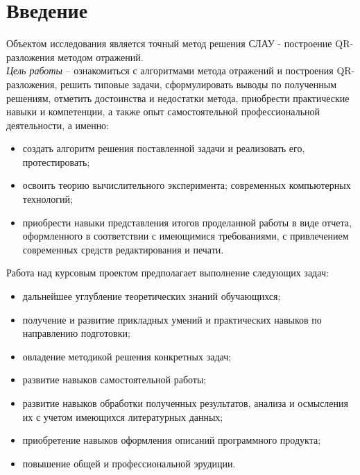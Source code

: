 \documentclass[14pt, titlepage, a4paper]{extarticle} %
\begin{document}
	
	\begin{comment}
	\fefutitlepage{Б8118-01.03.02миопд}{Бобров И.И.}{89376650756}{15}{\hspace{15pt}мая\hspace{15pt}}
	\defaultfont	
	\end{comment}


	\tableofcontents
	\pagebreak
	
	
	\section*{Введение}
	
	Объектом исследования является точный метод решения СЛАУ - построение QR-разложения методом отражений.\\
	\textit{Цель работы} – ознакомиться с алгоритмами метода отражений и построения QR-разложения, решить типовые задачи, сформулировать выводы по полученным решениям, отметить достоинства и недостатки метода, приобрести практические навыки и компетенции, а также опыт самостоятельной профессиональной деятельности, а именно:
	\begin{itemize}
		\item создать алгоритм решения поставленной задачи и реализовать его, протестировать;
		\item освоить теорию вычислительного эксперимента; современных компьютерных технологий; 
		\item приобрести навыки представления итогов проделанной работы в виде отчета, оформленного в соответствии с имеющимися требованиями, с привлечением современных средств редактирования и печати.	
	\end{itemize}
	Работа над курсовым проектом предполагает выполнение следующих задач:
	\begin{itemize}
		\item дальнейшее углубление теоретических знаний обучающихся;
		\item получение и развитие прикладных умений и практических навыков по направлению подготовки;
		\item овладение методикой решения конкретных задач;
		\item развитие навыков самостоятельной работы;
		\item развитие навыков обработки полученных результатов, анализа и осмысления их с учетом имеющихся литературных данных;
		\item приобретение навыков оформления описаний программного продукта;
		\item повышение общей и профессиональной эрудиции.
	\end{itemize}
\end{document}
